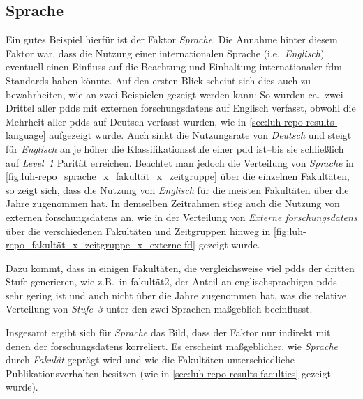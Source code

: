 \subsection{Sprache}
Ein gutes Beispiel hierfür ist der Faktor \textit{Sprache}.
Die Annahme hinter diesem Faktor war, dass die Nutzung einer internationalen Sprache (i.e.~\textit{Englisch}) eventuell einen Einfluss auf die Beachtung und Einhaltung internationaler \gls{fdm}-Standards haben könnte.
Auf den ersten Blick scheint sich dies auch zu bewahrheiten, wie an zwei Beispielen gezeigt werden kann: 
So wurden ca.~zwei Drittel aller \glspl{pdd} mit externen \glspl{forschungsdaten} auf Englisch verfasst, obwohl die Mehrheit aller \glspl{pdd} auf Deutsch verfasst wurden, wie in \cref{sec:luh-repo-results-language} aufgezeigt wurde.
Auch sinkt die Nutzungsrate von \textit{Deutsch} und steigt für \textit{Englisch} an je höher die Klassifikationsstufe einer \gls{pdd} ist--bis sie schließlich auf \textit{Level~1} Parität erreichen.
Beachtet man jedoch die Verteilung von \textit{Sprache} in \cref{fig:luh-repo_sprache_x_fakultät_x_zeitgruppe} über die einzelnen Fakultäten, so zeigt sich, dass die Nutzung von \textit{Englisch} für die meisten Fakultäten über die Jahre zugenommen hat.
In demselben Zeitrahmen stieg auch die Nutzung von externen \glspl{forschungsdaten} an, wie in der Verteilung von \textit{Externe \glspl{forschungsdaten}} über die verschiedenen Fakultäten und Zeitgruppen hinweg in \cref{fig:luh-repo_fakultät_x_zeitgruppe_x_externe-fd} gezeigt wurde.

Dazu kommt, dass in einigen Fakultäten, die vergleichsweise viel \glspl{pdd} der dritten Stufe generieren, wie z.B.~in \gls{fakultät2}, der Anteil an englischsprachigen \glspl{pdd} sehr gering ist und auch nicht über die Jahre zugenommen hat, was die relative Verteilung von \textit{Stufe~3} unter den zwei Sprachen maßgeblich beeinflusst.

Insgesamt ergibt sich für \textit{Sprache} das Bild, dass der Faktor nur indirekt mit denen der \glspl{forschungsdaten} korreliert.
Es erscheint maßgeblicher, wie \textit{Sprache} durch \textit{Fakulät} geprägt wird und wie die Fakultäten unterschiedliche Publikationsverhalten besitzen (wie in \cref{sec:luh-repo-results-faculties} gezeigt wurde).


